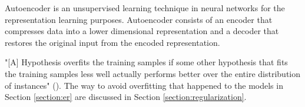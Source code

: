 \begin{definition}[Autoencoder]
	Autoencoder is an unsupervised learning technique in neural networks for the representation learning purposes. Autoencoder consists of an encoder that compresses data into a lower dimensional representation and a decoder that restores the original input from the encoded representation.
\end{definition}

\begin{definition}[Overfitting]
    "[A] Hypothesis overfits the training samples if some other hypothesis that fits the training samples less well actually performs better over the entire distribution of instances" (\cite{mitchell_1997}). The way to avoid overfitting that happened to the models in Section \ref{section:er} are discussed in Section \ref{section:regularization}.
\end{definition}
